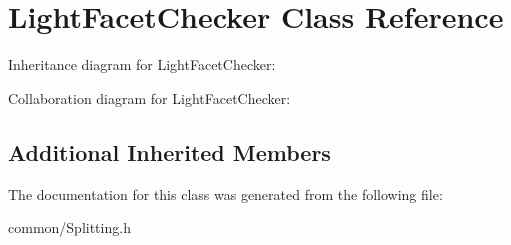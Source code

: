 \hypertarget{class_light_facet_checker}{}\section{Light\+Facet\+Checker Class Reference}
\label{class_light_facet_checker}


Inheritance diagram for Light\+Facet\+Checker\+:


Collaboration diagram for Light\+Facet\+Checker\+:
\subsection*{Additional Inherited Members}


The documentation for this class was generated from the following file\+:\begin{DoxyCompactItemize}
\item 
common/Splitting.\+h\end{DoxyCompactItemize}
